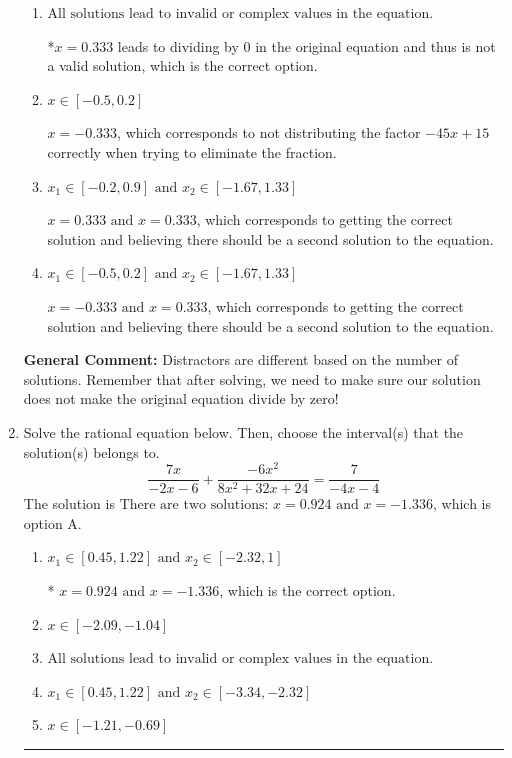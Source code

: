 \documentclass{extbook}[14pt]
\newcommand{\litem}[1]{\item #1

\rule{\textwidth}{0.4pt}}
\begin{document}
\begin{enumerate}
{\begin{enumerate}[label=\Alph*.]
$x = 0.333$, which corresponds to not checking if this value leads to dividing by 0 in the original equation and thus is not a valid solution.
\item \( \text{All solutions lead to invalid or complex values in the equation.} \)

*$x = 0.333$ leads to dividing by 0 in the original equation and thus is not a valid solution, which is the correct option.
\item \( x \in [-0.5,0.2] \)

$x = -0.333$, which corresponds to not distributing the factor $-45x + 15$ correctly when trying to eliminate the fraction.
\item \( x_1 \in [-0.2, 0.9] \text{ and } x_2 \in [-1.67,1.33] \)

$x = 0.333 \text{ and } x = 0.333$, which corresponds to getting the correct solution and believing there should be a second solution to the equation.
\item \( x_1 \in [-0.5, 0.2] \text{ and } x_2 \in [-1.67,1.33] \)

$x = -0.333 \text{ and } x = 0.333$, which corresponds to getting the correct solution and believing there should be a second solution to the equation.
\end{enumerate}

\textbf{General Comment:} Distractors are different based on the number of solutions. Remember that after solving, we need to make sure our solution does not make the original equation divide by zero!
}
\litem{
Solve the rational equation below. Then, choose the interval(s) that the solution(s) belongs to.
\[ \frac{7x}{-2x -6} + \frac{-6x^{2}}{8x^{2} +32 x + 24} = \frac{7}{-4x -4} \]
The solution is \( \text{There are two solutions: } x = 0.924 \text{ and } x = -1.336 \), which is option A.\begin{enumerate}[label=\Alph*.]
\item \( x_1 \in [0.45, 1.22] \text{ and } x_2 \in [-2.32,1] \)

* $x = 0.924 \text{ and } x = -1.336$, which is the correct option.
\item \( x \in [-2.09,-1.04] \)


\item \( \text{All solutions lead to invalid or complex values in the equation.} \)


\item \( x_1 \in [0.45, 1.22] \text{ and } x_2 \in [-3.34,-2.32] \)


\item \( x \in [-1.21,-0.69] \)



\end{enumerate}}
\end{enumerate}
\end{document}
